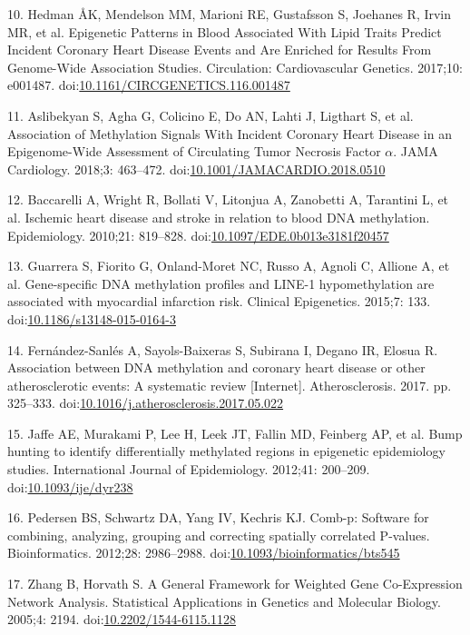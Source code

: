 \documentclass[]{article}
\theoremstyle{definition}
\theoremstyle{definition}
\theoremstyle{definition}
\theoremstyle{remark}
\begin{document}
10. Hedman ÅK, Mendelson MM, Marioni RE, Gustafsson S, Joehanes R, Irvin
MR, et al. Epigenetic Patterns in Blood Associated With Lipid Traits
Predict Incident Coronary Heart Disease Events and Are Enriched for
Results From Genome-Wide Association Studies. Circulation:
Cardiovascular Genetics. 2017;10: e001487.
doi:\href{http://dx.doi.org/10.1161/CIRCGENETICS.116.001487}{10.1161/CIRCGENETICS.116.001487}

11. Aslibekyan S, Agha G, Colicino E, Do AN, Lahti J, Ligthart S, et al.
Association of Methylation Signals With Incident Coronary Heart Disease
in an Epigenome-Wide Assessment of Circulating Tumor Necrosis Factor
\(\alpha\). JAMA Cardiology. 2018;3: 463--472.
doi:\href{http://dx.doi.org/10.1001/JAMACARDIO.2018.0510}{10.1001/JAMACARDIO.2018.0510}

12. Baccarelli A, Wright R, Bollati V, Litonjua A, Zanobetti A,
Tarantini L, et al. Ischemic heart disease and stroke in relation to
blood DNA methylation. Epidemiology. 2010;21: 819--828.
doi:\href{http://dx.doi.org/10.1097/EDE.0b013e3181f20457}{10.1097/EDE.0b013e3181f20457}

13. Guarrera S, Fiorito G, Onland-Moret NC, Russo A, Agnoli C, Allione
A, et al. Gene-specific DNA methylation profiles and LINE-1
hypomethylation are associated with myocardial infarction risk. Clinical
Epigenetics. 2015;7: 133.
doi:\href{http://dx.doi.org/10.1186/s13148-015-0164-3}{10.1186/s13148-015-0164-3}

14. Fern{á}ndez-Sanl{é}s A, Sayols-Baixeras S, Subirana I, Degano IR,
Elosua R. Association between DNA methylation and coronary heart disease
or other atherosclerotic events: A systematic review {[}Internet{]}.
Atherosclerosis. 2017. pp. 325--333.
doi:\href{http://dx.doi.org/10.1016/j.atherosclerosis.2017.05.022}{10.1016/j.atherosclerosis.2017.05.022}

15. Jaffe AE, Murakami P, Lee H, Leek JT, Fallin MD, Feinberg AP, et al.
Bump hunting to identify differentially methylated regions in epigenetic
epidemiology studies. International Journal of Epidemiology. 2012;41:
200--209.
doi:\href{http://dx.doi.org/10.1093/ije/dyr238}{10.1093/ije/dyr238}

16. Pedersen BS, Schwartz DA, Yang IV, Kechris KJ. Comb-p: Software for
combining, analyzing, grouping and correcting spatially correlated
P-values. Bioinformatics. 2012;28: 2986--2988.
doi:\href{http://dx.doi.org/10.1093/bioinformatics/bts545}{10.1093/bioinformatics/bts545}

17. Zhang B, Horvath S. A General Framework for Weighted Gene
Co-Expression Network Analysis. Statistical Applications in Genetics and
Molecular Biology. 2005;4: 2194.
doi:\href{http://dx.doi.org/10.2202/1544-6115.1128}{10.2202/1544-6115.1128}
\end{document}
